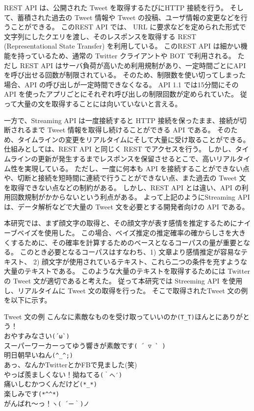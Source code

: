 \documentclass[11pt,a4j]{jsarticle}
\begin{document}
REST API は、公開された Tweet を取得するたびにHTTP 接続を行う。
そして、蓄積された過去の Tweet 情報や Tweet の投稿、ユーザ情報の変更などを行うことができる。
このREST API では、 URL に要求などを定められた形式で文字列にしたクエリを渡し、そのレスポンスを取得する REST (Representational State Transfer) を利用している。
このREST API は細かい機能を持っているため、通常の Twitter クライアントや BOT で利用される。
ただし REST API はサーバ負荷が高いため利用規制があり、一定時間ごとにAPI を呼び出せる回数が制限されている。
そのため、制限数を使い切ってしまった場合、API の呼び出しが一定時間できなくなる。
API 1.1 では15分間にその API を使ったアプリごとにそれぞれ呼び出しの制限回数が定められていた。
従って大量の文を取得することには向いていないと言える。

一方で、Streaming API は一度接続すると HTTP 接続を保ったまま、接続が切断されるまで Tweet 情報を取得し続けることができる API である。
そのため、タイムラインの変更をリアルタイムにそして大量に受け取ることができる。
仕組みとしては、REST API と同じく REST でアクセスを行う。
しかし、タイムラインの更新が発生するまでレスポンスを保留させるとこで、高いリアルタイム性を実現している。
ただし、一度に何本も API を接続することができない点や、切断と接続を短時間に連続で行うことができない点、また過去の Tweet 文を取得できない点などの制約がある。
しかし、REST API とは違い、API の利用回数規制がかからないという利点がある。
よって上記のようにStreaming API は、データ解析などで大量の Tweet 文を必要とする開発者向けの API である。

本研究では、まず顔文字の取得と、その顔文字が表す感情を推定するためにナイーブベイズを使用した。
この場合、ベイズ推定の推定確率の確からしさを大きくするために、その確率を計算するためのベースとなるコーパスの量が重要となる。
このとき必要となるコーパスはすなわち、1) 文章より感情推定が容易なテキスト、 2) 顔文字が使用されているテキスト、これら二つの条件を充すような大量のテキストである。
このような大量のテキストを取得するためには Twitter の Tweet 文が適切であると考えた。
従って本研究では Streeming API を使用し、リアルタイムに Tweet 文の取得を行った。
そこで取得されたTweet 文の例を以下に示す。

\begin{itembox}[c]{Tweet 文の例}
  こんなに素敵なものを受け取っていいのか\verb|(T_T)|ほんとにありがとう！\\
  おやすみなさい\verb|(´ω`)| \\
  スーパーワーカーってゆう響きが素敵です\verb|( ´ ▽ ` )| \\
  明日朝早いねん\verb|(^_^;)| \\
  あっ、なんかTwitterとかFBで見ました(笑)\\
  やっぱ羨ましくない！拗ねてる\verb|(｀へ′)| \\
  痛いしむかつくんだけど\verb|(*_*)| \\
  楽しみです\verb|(*^^*)| \\
  がんばれ〜っ！\verb|ヽ( ´ー｀)ノ|\\
\end{itembox}
\end{document}
